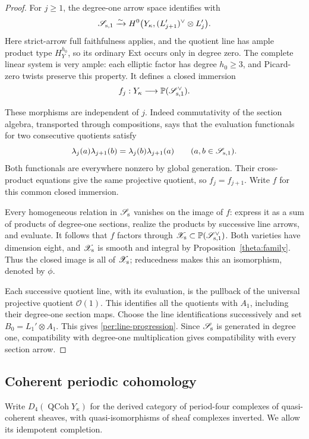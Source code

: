 \documentclass[11pt]{article}
\theoremstyle{definition}
\theoremstyle{remark}
\numberwithin{equation}{section}
\begin{document}
\begin{proof}
For $j\ge1$, the degree-one arrow space identifies with
\[
 \mathscr S_{{\rm s},1}
    \xrightarrow{\sim}
 H^0\bigl(Y_\kappa,(L_{j+1}')^\vee\otimes L_j'\bigr).
\]
Here strict-arrow full faithfulness applies, and the quotient line
has ample product type $H_Y^{h_0}$, so its ordinary Ext occurs only
in degree zero.  The complete linear system is very ample: each
elliptic factor has degree $h_0\ge3$, and Picard-zero twists preserve
this property.  It defines a closed immersion
\[
 f_j:Y_\kappa\longrightarrow
        \mathbb P(\mathscr S_{{\rm s},1}^{\vee}).
\]

These morphisms are independent of $j$.  Indeed commutativity of
the section algebra, transported through compositions, says that
the evaluation functionals for two consecutive quotients satisfy
\[
 \lambda_j(a)\lambda_{j+1}(b)
       =\lambda_j(b)\lambda_{j+1}(a)
       \qquad(a,b\in\mathscr S_{{\rm s},1}).
\]
Both functionals are everywhere nonzero by global generation.
Their cross-product equations give the same projective quotient,
so $f_j=f_{j+1}$.  Write $f$ for this common closed immersion.

Every homogeneous relation in $\mathscr S_{\rm s}$ vanishes on
the image of $f$: express it as a sum of products of degree-one
sections, realize the products by successive line arrows, and
evaluate.  It follows that $f$ factors through
$\mathscr X_{\rm s}\subset
\mathbb P(\mathscr S_{{\rm s},1}^{\vee})$.  Both varieties have
dimension eight, and $\mathscr X_{\rm s}$ is smooth and integral
by Proposition~\ref{theta:family}.  Thus the closed image is all of
$\mathscr X_{\rm s}$; reducedness makes this an isomorphism, denoted
by $\phi$.

Each successive quotient line, with its evaluation, is the pullback
of the universal projective quotient $\mathcal O(1)$.  This identifies all
the quotients with $A_1$, including their degree-one section maps.
Choose the line identifications successively and set
$B_0=L_1'\otimes A_1$.  This gives
\eqref{per:line-progression}.  Since $\mathscr S_{\rm s}$ is generated
in degree one, compatibility with degree-one multiplication gives
compatibility with every section arrow.
\end{proof}

\subsection{Coherent periodic cohomology}

Write $D_4(\operatorname{QCoh}Y_\kappa)$ for the derived category of
period-four complexes of quasi-coherent sheaves, with
quasi-isomorphisms of sheaf complexes inverted.  We allow its idempotent
completion.
\end{document}
